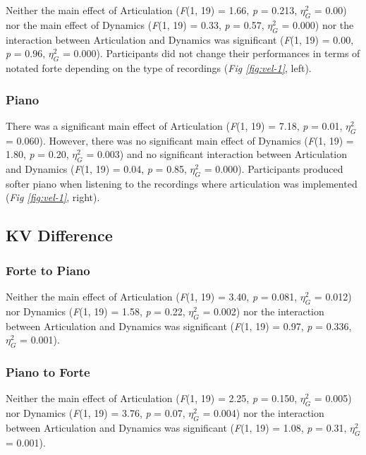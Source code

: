 \documentclass[
  man,floatsintext]{apa6}
\begin{document}
Neither the main effect of Articulation (\emph{F}(1, 19) = 1.66, \emph{p} = 0.213, \(\eta_G^2\) = 0.00) nor the main effect of Dynamics (\emph{F}(1, 19) = 0.33, \emph{p} = 0.57, \(\eta_G^2\) = 0.000) nor the interaction between Articulation and Dynamics was significant (\emph{F}(1, 19) = 0.00, \emph{p} = 0.96, \(\eta_G^2\) = 0.000). Participants did not change their performances in terms of notated forte depending on the type of recordings (\emph{Fig \ref{fig:vel-1}}, left).

\hypertarget{piano}{%
\subsubsection{Piano}\label{piano}}

There was a significant main effect of Articulation (\emph{F}(1, 19) = 7.18, \emph{p} = 0.01, \(\eta_G^2\) = 0.060). However, there was no significant main effect of Dynamics (\emph{F}(1, 19) = 1.80, \emph{p} = 0.20, \(\eta_G^2\) = 0.003) and no significant interaction between Articulation and Dynamics (\emph{F}(1, 19) = 0.04, \emph{p} = 0.85, \(\eta_G^2\) = 0.000). Participants produced softer piano when listening to the recordings where articulation was implemented (\emph{Fig \ref{fig:vel-1}}, right).

\hypertarget{kv-difference}{%
\subsection{KV Difference}\label{kv-difference}}

\hypertarget{forte-to-piano}{%
\subsubsection{Forte to Piano}\label{forte-to-piano}}

Neither the main effect of Articulation (\emph{F}(1, 19) = 3.40, \emph{p} = 0.081, \(\eta_G^2\) = 0.012) nor Dynamics (\emph{F}(1, 19) = 1.58, \emph{p} = 0.22, \(\eta_G^2\) = 0.002) nor the interaction between Articulation and Dynamics was significant (\emph{F}(1, 19) = 0.97, \emph{p} = 0.336, \(\eta_G^2\) = 0.001).

\hypertarget{piano-to-forte}{%
\subsubsection{Piano to Forte}\label{piano-to-forte}}

Neither the main effect of Articulation (\emph{F}(1, 19) = 2.25, \emph{p} = 0.150, \(\eta_G^2\) = 0.005) nor Dynamics (\emph{F}(1, 19) = 3.76, \emph{p} = 0.07, \(\eta_G^2\) = 0.004) nor the interaction between Articulation and Dynamics was significant (\emph{F}(1, 19) = 1.08, \emph{p} = 0.31, \(\eta_G^2\) = 0.001).
\end{document}
